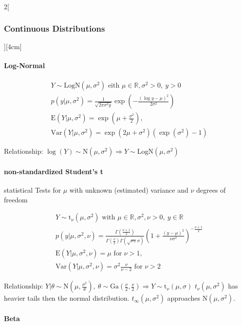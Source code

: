 \documentclass[8pt]{extarticle}
\begin{document}
\begin{multicols}{2}[\subsubsection{Continuous Distributions}][4cm]
    \paragraph{Log-Normal}
  
    \begin{align*}
    & Y \sim \mathrm{LogN}(\mu, \sigma^2) \text{ eith } \mu \in \mathbb{R}, \sigma^2 > 0,\: y > 0 \\
    & p(y|\mu, \sigma^2) =\frac{1}{\sqrt{2\pi\sigma^2 y}} \exp \left(-\frac{(\log y-\mu)^2}{2 \sigma^2} \right) \\
    & \mathrm{E}(Y|\mu, \sigma^2) = \exp (\mu + \frac{\sigma^2}{2}) ,\\
    & \mathrm{Var}(Y|\mu, \sigma^2) = \exp (2\mu + \sigma^2)(\exp (\sigma^2) - 1)
  \end{align*}
  
\noindent Relationship: $\log (Y) \sim \mathrm{N}(\mu, \sigma^2) \Rightarrow Y \sim \mathrm{LogN}(\mu, \sigma^2)$
  
    \paragraph{non-standardized Student's t} statistical Tests for $\mu$ with unknown (estimated) variance and $\nu$ degrees of freedom
  
    \begin{align*}
    & Y \sim \mathrm{t}_\nu(\mu, \sigma^2) \text{ with } \mu \in \mathbb{R}, \sigma^2, \nu > 0,\: y \in \mathbb{R}\\
    & p(y|\mu, \sigma^2, \nu) =\frac{\Gamma \left( \frac{\nu + 1}{2}\right) }{\Gamma (\frac{\nu}{2}) \Gamma (\sqrt{\nu\pi}\sigma)} \left(1+ \frac{(y-\mu)^2}{\nu \sigma^2} \right)^{-\frac{\nu + 1}{2}} \\
    & \mathrm{E}(Y|\mu, \sigma^2, \nu) = \mu \text{ for }  \nu > 1,\\
    & \mathrm{Var}(Y|\mu, \sigma^2, \nu) = \sigma^2 \frac{\nu}{\nu-2} \text{ for }  \nu > 2
  \end{align*}
  
 \noindent Relationship: $Y|\theta \sim \mathrm{N}(\mu, \frac{\sigma^2}{\theta}), \: \theta \sim  \mathrm{Ga}(\frac{\nu}{2}, \frac{\nu}{2}) \Rightarrow Y \sim \mathrm{t}_\nu(\mu, \sigma)$ 
 $t_\nu(\mu,\sigma^2)$ has heavier tails then the normal distribution. $t_\infty(\mu,\sigma^2)$ approaches $\mathrm{N}(\mu,\sigma^2)$.
  
	\paragraph{Beta}
  

\end{multicols}
\end{document}
